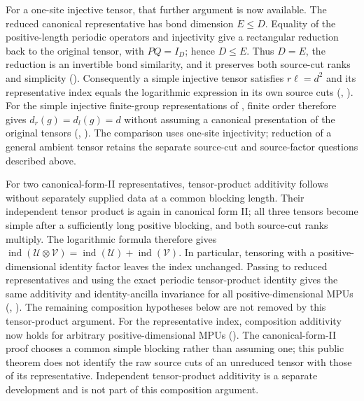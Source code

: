 \documentclass{article}
\begin{document}
For a one-site injective tensor, that further argument is now available.
The reduced canonical representative has bond dimension $E\leq D$.
Equality of the positive-length periodic operators and injectivity give a
rectangular reduction back to the original tensor, with $PQ=I_D$; hence
$D\leq E$. Thus $D=E$, the reduction is an invertible bond similarity, and
it preserves both source-cut ranks and simplicity
().
Consequently a simple injective tensor satisfies $r\ell=d^2$ and its
representative index equals the logarithmic expression in its own source
cuts
(,
).
For the simple injective finite-group representations of
\cite[lines~1403--1407 and~1547]{FrancoRubio2025MPUGauging}, finite order
therefore gives $d_r(g)=d_l(g)=d$ without assuming a canonical presentation
of the original tensors
(,
).
The comparison uses one-site injectivity; reduction of a general ambient
tensor retains the separate source-cut and source-factor questions described
above.

For two canonical-form-II representatives, tensor-product additivity follows without
separately supplied data at a common blocking length. Their independent
tensor product is again in canonical form II; all three tensors become simple
after a sufficiently long positive blocking, and both source-cut ranks
multiply. The logarithmic formula therefore gives
$\operatorname{ind}(\mathcal U\otimes\mathcal V)
    =\operatorname{ind}(\mathcal U)+\operatorname{ind}(\mathcal V)$.
In particular, tensoring with a positive-dimensional identity factor leaves
the index unchanged. Passing to reduced representatives and using the exact
periodic tensor-product identity gives the same additivity and identity-ancilla
invariance for all positive-dimensional MPUs
(,
). The remaining
composition hypotheses below are not removed by this tensor-product argument.
For the representative index, composition additivity now holds for arbitrary
positive-dimensional MPUs (). The
canonical-form-II proof chooses a common simple blocking rather than assuming
one; this public theorem does not identify the raw source cuts of an unreduced
tensor with those of its representative. Independent tensor-product
additivity is a separate development and is not part of this composition
argument.
\end{document}
